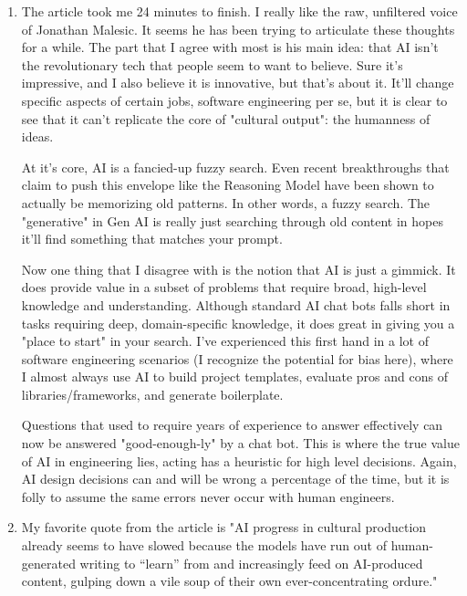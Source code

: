 \documentclass{article}
\begin{document}
\begin{enumerate}
    \item {
        The article took me 24 minutes to finish. I really like the raw, unfiltered
        voice of Jonathan Malesic. It seems he has been trying to articulate 
        these thoughts for a while. The part that I agree with most is his main 
        idea: that AI isn't the revolutionary tech that people seem to want to 
        believe. Sure it's impressive, and I also believe it is innovative, but 
        that's about it. It'll change specific aspects of certain jobs,
        software engineering per se, but it is clear to see that it can't replicate
        the core of "cultural output": the humanness of ideas.

        At it's core, AI is a fancied-up fuzzy search. Even recent breakthroughs
        that claim to push this envelope like the Reasoning Model have been shown 
        to actually be memorizing old patterns. In other words, a fuzzy search. 
        The "generative" in Gen AI is really just searching through old content 
        in hopes it'll find something that matches your prompt. 

        Now one thing that I disagree with is the notion that AI is just a gimmick. 
        It does provide value in a subset of problems that require broad, high-level
        knowledge and understanding. Although standard AI chat bots falls short 
        in tasks requiring deep, domain-specific knowledge, it does great in giving
        you a "place to start" in your search. I've experienced this first hand 
        in a lot of software engineering scenarios (I recognize the potential for
        bias here), where I almost always use AI to build project templates, 
        evaluate pros and cons of libraries/frameworks, and generate boilerplate. 

        Questions that used to require years of experience to answer effectively
        can now be answered "good-enough-ly" by a chat bot. This is where the true 
        value of AI in engineering lies, acting has a heuristic for high level decisions.
        Again, AI design decisions can and will be wrong a percentage of the time,
        but it is folly to assume the same errors never occur with human engineers.
    
    }

    \item {
        My favorite quote from the article is "AI progress in cultural production 
        already seems to have slowed because the models have run out of 
        human-generated writing to “learn” from and increasingly feed on AI-produced 
        content, gulping down a vile soup of their own ever-concentrating ordure." 

}
\end{enumerate}
\end{document}
